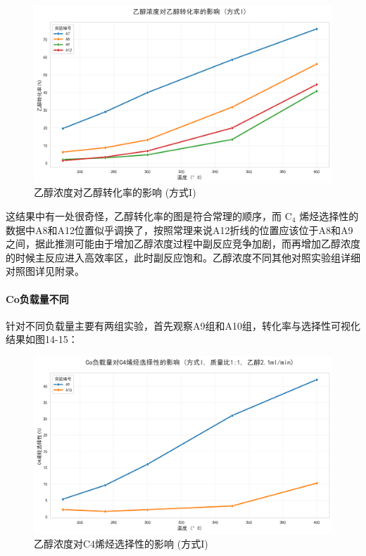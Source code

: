 \begin{figure}[h]%
	\centering%
	\includegraphics [scale=0.6]{图/2-2-3-2.png}
	\caption{乙醇浓度对乙醇转化率的影响 (方式I)} 
	\label{fig:1}
\end{figure}

这结果中有一处很奇怪，乙醇转化率的图是符合常理的顺序，而 \( \text{C}_4 \) 烯烃选择性的数据中A8和A12位置似乎调换了，按照常理来说A12折线的位置应该位于A8和A9之间，据此推测可能由于增加乙醇浓度过程中副反应竞争加剧，而再增加乙醇浓度的时候主反应进入高效率区，此时副反应饱和。乙醇浓度不同其他对照实验组详细对照图详见附录。





\paragraph{Co负载量不同}
针对不同负载量主要有两组实验，首先观察A9组和A10组，转化率与选择性可视化结果如图14-15：

\newpage

\begin{figure}[h]%
	\centering%
	\includegraphics [scale=0.6]{图/2-3-2-1.png}
	\caption{乙醇浓度对C4烯烃选择性的影响 (方式I)} 
	\label{fig:1}
\end{figure}

